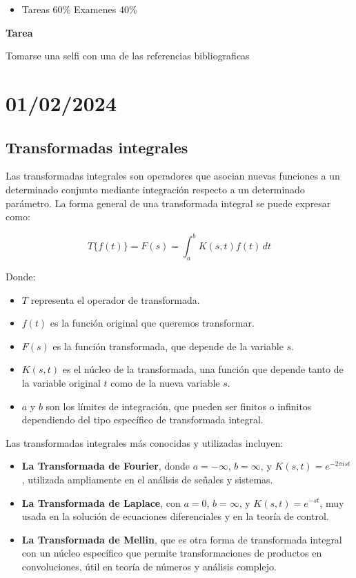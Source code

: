 \documentclass{article}
\begin{document}
\begin{itemize}
    \item Tareas 60\% Examenes 40\%
\end{itemize}

\textbf{Tarea}

Tomarse una selfi con una de las referencias bibliograficas

\section{01/02/2024}

\subsection{Transformadas integrales}

Las transformadas integrales son operadores que asocian nuevas funciones a un determinado conjunto mediante integración respecto a un determinado parámetro. La forma general de una transformada integral se puede expresar como:

\[
    T\{f(t)\} = F(s) = \int_{a}^{b} K(s, t) f(t) \, dt
\]

Donde:
\begin{itemize}
    \item $T$ representa el operador de transformada.
    \item $f(t)$ es la función original que queremos transformar.
    \item $F(s)$ es la función transformada, que depende de la variable $s$.
    \item $K(s, t)$ es el núcleo de la transformada, una función que depende tanto de la variable original $t$ como de la nueva variable $s$.
    \item $a$ y $b$ son los límites de integración, que pueden ser finitos o infinitos dependiendo del tipo específico de transformada integral.
\end{itemize}

Las transformadas integrales más conocidas y utilizadas incluyen:

\begin{itemize}
    \item \textbf{La Transformada de Fourier}, donde $a = -\infty$, $b = \infty$, y $K(s, t) = e^{-2\pi ist}$, utilizada ampliamente en el análisis de señales y sistemas.
    \item \textbf{La Transformada de Laplace}, con $a = 0$, $b = \infty$, y $K(s, t) = e^{-st}$, muy usada en la solución de ecuaciones diferenciales y en la teoría de control.
    \item \textbf{La Transformada de Mellin}, que es otra forma de transformada integral con un núcleo específico que permite transformaciones de productos en convoluciones, útil en teoría de números y análisis complejo.
\end{itemize}
\end{document}
